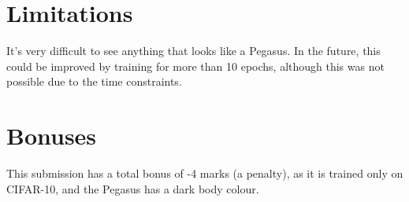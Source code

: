 \documentclass{article}
\begin{document}
\section{Limitations}
It's very difficult to see anything that looks like a Pegasus. In the future, this could be improved by training for more than 10 epochs, although this was not possible due to the time constraints.

\section*{Bonuses}
This submission has a total bonus of -4 marks (a penalty), as it is trained only on CIFAR-10, and the Pegasus has a dark body colour.

\printbibliography
\end{document}
